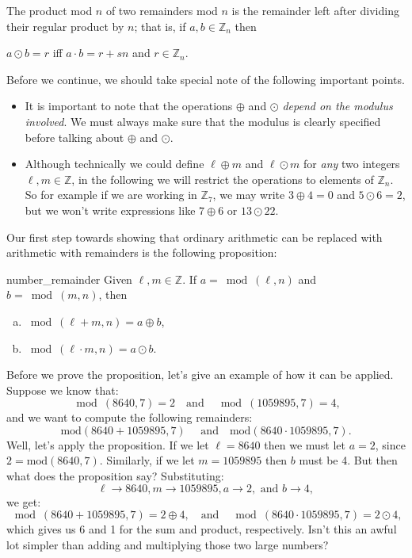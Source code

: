 \begin{defn}\label{definition:modular:mod_mult}

\noindent
The product mod $n$ of two remainders mod $n$ is the remainder left after dividing their regular product by $n$; that is, if $a,b \in {\mathbb Z}_n$ then

\begin{center}
$a \odot b = r$ iff  $a \cdot b = r + sn$ and 
$r \in {\mathbb Z}_n.$
\end{center}
\end{defn}
Before we continue, we should take special note of the following important points.

\begin{rem}
\begin{itemize}
\item
It is important to note that the operations $\oplus$ and $\odot$ \emph{depend on the modulus involved}. We must always make sure that the modulus is clearly specified before talking about $\oplus$ and $\odot$.
\item
Although technically we could define $\ell \oplus m$ and $\ell \odot m$ for \emph{any} two integers $\ell,m \in \mathbb{Z}$, in the following we will restrict the operations to elements of  $ \mathbb{Z}_n$.  So for example  if we are working in $\mathbb{Z}_7$, we may write $3 \oplus 4 = 0$ and $5 \odot 6 = 2$, but we won't write expressions like $7 \oplus 6$ or $13 \odot 22$.
\end{itemize}
\end{rem}

Our first step towards showing that ordinary arithmetic can be replaced with arithmetic with remainders is the following proposition:

\begin{prop}{number_remainder}
Given $\ell,m \in {\mathbb Z}$. If $a =\bmod(\ell,n)$ and $b=\bmod(m,n)$, then 
\begin{enumerate}[(a)]
\item
$\bmod(\ell+ m,n) = a \oplus b$, 
\item
$\bmod(\ell \cdot m,n) = a \odot b$.
\end{enumerate}
\end{prop}

Before we prove the proposition, let's give an example of how it can be applied. Suppose we know that:
\[   \bmod(8640,7)= 2 \quad \text{and} \quad \bmod(1059895,7)=  4,
\] 
and we want to compute the following remainders: 
\[
\text{mod}(8640 + 1059895,7) \quad \text{ and} \quad  \text{mod}(8640 \cdot 1059895, 7).
\]  
Well, let's apply the proposition. If we let $\ell=8640$ then we must let $a=2$, since $2=\text{mod}(8640,7)$. Similarly, if we let $m=1059895$ then  $b$ must be 4. But then what does the proposition say? Substituting: 
\[
\ell \rightarrow 8640, m \rightarrow 1059895, a \rightarrow 2, \text{ and } b \rightarrow 4,
\]
we get:
\[
\bmod(8640+ 1059895,7) = 2 \oplus 4 , \quad \text{and} \quad \bmod(8640 \cdot 1059895,7) = 2 \odot 4,
\]
which gives us 6 and 1  for the sum and product, respectively.  Isn't this  an awful lot simpler than adding and multiplying those two large numbers?

